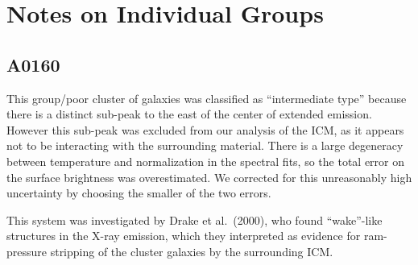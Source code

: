 \documentclass[structabstract]{aa}
\begin{document}
\nocite{Russell-Ponman-Sanderson:07}
\nocite{Rykoff-Evrard-McKay:08}
\nocite{Sanderson-Ponman-Finoguenov:03}
\nocite{Sanderson-Ponman-O'Sullivan:06}
\nocite{Sato-Matsushita-Ishisaki:09}
\nocite{Sato-Kawaharada-Nakazawa:10}
\nocite{Shang-Scharf:09}
\nocite{Simionescu-Allen-Mantz:11}
\nocite{Snowden-Mushotzky-Kuntz:08}
\nocite{Spavone-Iodice-Longo:06}
\nocite{Stanek-Evrard-Boehringer:06}
\nocite{Subrahmanyan-Beasley-Goss:03}
\nocite{Sun-Forman-Vikhlinin:03}
\nocite{Sun-Voit-Donahue:09}
\nocite{Takizawa-Nagino-Matsushita:10}
\nocite{Tokoi-Sato-Ishisaki:08}
\nocite{Tovmassian-Plionis:09}
\nocite{Trinchieri-Breitschwerdt-Pietsch:07}
\nocite{Urban-Werner-Simionescu:11}
\nocite{Ventimiglia-Voit-Donahue:08}
\nocite{Vikhlinin-Markevitch-Murray:05}
\nocite{Vikhlinin-Kravtsov-Forman:06}
\nocite{Vikhlinin:06}
\nocite{Vikhlinin-Burenin-Ebeling:09}
\nocite{Vikhlinin-Kravtsov-Burenin:09}
\nocite{Worrall-Birkinshaw-Kraft:07}
\nocite{Xue-Wu:00a}
\nocite{Xue-Wu:00b}
\nocite{Yang-Ricker-Sutter:09}
\nocite{Zhang-Finoguenov-Boehringer:08}
\nocite{Zhang-Reiprich-Finoguenov:09}
\nocite{Zhang-Okabe-Finoguenov:10}
\nocite{Zhang-Andernach-Caretta:11}

%
%
%
\appendix
%
\onecolumn
\section{Notes on Individual Groups}\label{sec:notes}
 \subsection*{A0160}
This group/poor cluster of galaxies was classified as ``intermediate type''
because there is a distinct sub-peak to the east of the center of extended
emission. However this sub-peak was excluded from our analysis of the ICM, as
it appears not to be interacting with the surrounding material. There is a
large degeneracy between temperature and normalization in the spectral fits,
so the total error on the surface brightness was overestimated. We corrected
for this unreasonably high uncertainty by choosing the smaller of the two
errors.

This system was investigated by Drake et al.\ (2000),
who found ``wake''-like structures in the X-ray emission, which they interpreted
as evidence for ram-pressure stripping of the cluster galaxies by the
surrounding ICM.
\end{document}

